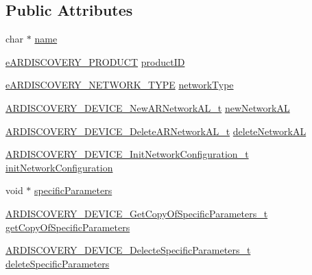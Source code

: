 \subsection*{Public Attributes}
\begin{DoxyCompactItemize}
\item 
char $\ast$ \hyperlink{struct_a_r_d_i_s_c_o_v_e_r_y___device__t_a2f213df4cbfdf8afbc422a85d5f7fe56}{name}
\item 
\hyperlink{_a_r_d_i_s_c_o_v_e_r_y___discovery_8h_a908972407587656a48194c58ccd65813}{e\+A\+R\+D\+I\+S\+C\+O\+V\+E\+R\+Y\+\_\+\+P\+R\+O\+D\+U\+CT} \hyperlink{struct_a_r_d_i_s_c_o_v_e_r_y___device__t_a2c696ace3b6c5d06320ce5c65c838bdb}{product\+ID}
\item 
\hyperlink{_a_r_d_i_s_c_o_v_e_r_y___discovery_8h_ac9129d58f46d32150cd2f75cd3709717}{e\+A\+R\+D\+I\+S\+C\+O\+V\+E\+R\+Y\+\_\+\+N\+E\+T\+W\+O\+R\+K\+\_\+\+T\+Y\+PE} \hyperlink{struct_a_r_d_i_s_c_o_v_e_r_y___device__t_af528e9d669171d86b15e728100e16770}{network\+Type}
\item 
\hyperlink{_a_r_d_i_s_c_o_v_e_r_y___device_8h_a10a87da9230caea749a74bafa09753bf}{A\+R\+D\+I\+S\+C\+O\+V\+E\+R\+Y\+\_\+\+D\+E\+V\+I\+C\+E\+\_\+\+New\+A\+R\+Network\+A\+L\+\_\+t} \hyperlink{struct_a_r_d_i_s_c_o_v_e_r_y___device__t_a823214525e834b28fe77db01f6818152}{new\+Network\+AL}
\item 
\hyperlink{_a_r_d_i_s_c_o_v_e_r_y___device_8h_a107375158dde241b1807827f3f11e271}{A\+R\+D\+I\+S\+C\+O\+V\+E\+R\+Y\+\_\+\+D\+E\+V\+I\+C\+E\+\_\+\+Delete\+A\+R\+Network\+A\+L\+\_\+t} \hyperlink{struct_a_r_d_i_s_c_o_v_e_r_y___device__t_aee29be83d18ebe6d70182a7ef02b0691}{delete\+Network\+AL}
\item 
\hyperlink{_a_r_d_i_s_c_o_v_e_r_y___device_8h_abce6d2c07b5f1b853aaa83e4be5de70c}{A\+R\+D\+I\+S\+C\+O\+V\+E\+R\+Y\+\_\+\+D\+E\+V\+I\+C\+E\+\_\+\+Init\+Network\+Configuration\+\_\+t} \hyperlink{struct_a_r_d_i_s_c_o_v_e_r_y___device__t_af9c25c3d21c6cf02a24ff893fa417c2b}{init\+Network\+Configuration}
\item 
void $\ast$ \hyperlink{struct_a_r_d_i_s_c_o_v_e_r_y___device__t_a7240fa1d8cf4a3fb56c68b14dd2311ed}{specific\+Parameters}
\item 
\hyperlink{_a_r_d_i_s_c_o_v_e_r_y___device_8h_aceb1e3ea2d04ecef6866f8c1227b03a1}{A\+R\+D\+I\+S\+C\+O\+V\+E\+R\+Y\+\_\+\+D\+E\+V\+I\+C\+E\+\_\+\+Get\+Copy\+Of\+Specific\+Parameters\+\_\+t} \hyperlink{struct_a_r_d_i_s_c_o_v_e_r_y___device__t_a3a7a25c7d5af77441d7498bd42e62726}{get\+Copy\+Of\+Specific\+Parameters}
\item 
\hyperlink{_a_r_d_i_s_c_o_v_e_r_y___device_8h_aa895834b4158a3400f9a7f133d971bf3}{A\+R\+D\+I\+S\+C\+O\+V\+E\+R\+Y\+\_\+\+D\+E\+V\+I\+C\+E\+\_\+\+Delecte\+Specific\+Parameters\+\_\+t} \hyperlink{struct_a_r_d_i_s_c_o_v_e_r_y___device__t_a8a3e1add54540bfb8f7342e21913e799}{delete\+Specific\+Parameters}
\end{DoxyCompactItemize}


